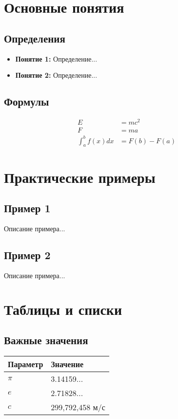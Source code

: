 \documentclass[10pt,landscape,a4paper]{article}
\begin{document}
\begin{multicols}{2}

\section{Основные понятия}

\subsection{Определения}
\begin{itemize}
    \item \textbf{Понятие 1:} Определение...
    \item \textbf{Понятие 2:} Определение...
\end{itemize}

\subsection{Формулы}
\begin{align}
    E &= mc^2 \\
    F &= ma \\
    \int_a^b f(x) dx &= F(b) - F(a)
\end{align}

\section{Практические примеры}

\subsection{Пример 1}
Описание примера...

\subsection{Пример 2}
Описание примера...

\section{Таблицы и списки}

\subsection{Важные значения}
\begin{center}
\begin{tabular}{@{}ll@{}}
\toprule
Параметр & Значение \\
\midrule
$\pi$ & 3.14159... \\
$e$ & 2.71828... \\
$c$ & 299,792,458 м/с \\
\bottomrule
\end{tabular}
\end{center}


\end{multicols}
\end{document}
